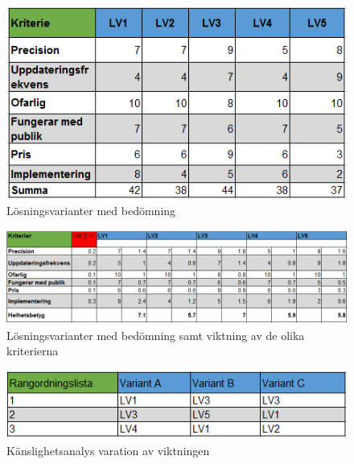 \documentclass[11pt, a4paper]{report}
\begin{document}
\begin{figure}[H]
	\begin{center}
		\includegraphics [width=12cm,angle=0]{bedomningavkrit.PNG}
		\caption{Lösningsvarianter med bedömning}
		\label{fig:medbedomning}
	\end{center}
\end{figure}

\begin{figure}[H]
	\begin{center}
		\includegraphics [width=12cm,angle=0]{bedomningvikt.PNG}
		\caption{Lösningsvarianter med bedömning samt viktning av de olika kriterierna}
		\label{fig:bedomningvikt}
	\end{center}
\end{figure}

\begin{figure}[H]
	\begin{center}
		\includegraphics [width=12cm,angle=0]{rangordning.PNG}
		\caption{Känslighetsanalys varation av viktningen}
		\label{fig:rangordning}
	\end{center}
\end{figure}
\end{document}
